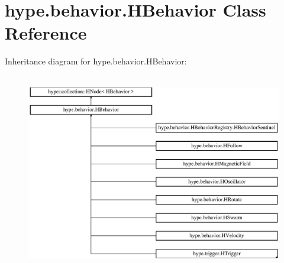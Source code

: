 \hypertarget{classhype_1_1behavior_1_1_h_behavior}{\section{hype.\-behavior.\-H\-Behavior Class Reference}
\label{classhype_1_1behavior_1_1_h_behavior}
}
Inheritance diagram for hype.\-behavior.\-H\-Behavior\-:\begin{figure}[H]
\begin{center}
\leavevmode
\includegraphics[height=8.722742cm]{classhype_1_1behavior_1_1_h_behavior}
\end{center}
\end{figure}

